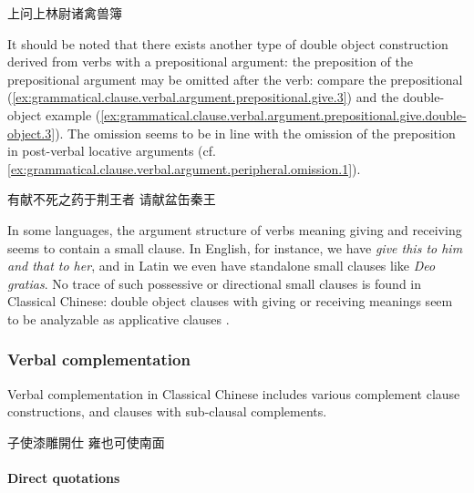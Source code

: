 \documentclass[UTF8, a4paper, oneside, scheme=plain, 12pt]{ctexrep}
\newcommand*{\citepages}[1]{pp.~{#1}}
\newcommand{\form}[1]{\emph{#1}}
\begin{document}
\begin{exe}
    \ex\label{ex:grammatical.clause.verbal.argument.prepositional.ask.double-object.2} 上问上林尉诸禽兽簿
\end{exe}

It should be noted that there exists another type of double object construction
derived from verbs with a prepositional argument:
the preposition of the prepositional argument may be omitted after the verb:
compare the prepositional (\ref{ex:grammatical.clause.verbal.argument.prepositional.give.3})
and the double-object example (\ref{ex:grammatical.clause.verbal.argument.prepositional.give.double-object.3}).
The omission seems to be in line with the omission of the preposition in post-verbal locative arguments (cf. \ref{ex:grammatical.clause.verbal.argument.peripheral.omission.1}).

\begin{exe}
    \ex\label{ex:grammatical.clause.verbal.argument.prepositional.give.3} 有献不死之药于荆王者
    \ex\label{ex:grammatical.clause.verbal.argument.prepositional.give.double-object.3}  请献盆缶秦王 
\end{exe}

In some languages, the argument structure of verbs meaning giving and receiving
seems to contain a small clause.
In English, for instance, we have \form{give this to him and that to her},
and in Latin we even have standalone small clauses like \form{Deo gratias}.
No trace of such possessive or directional small clauses is found in Classical Chinese:
double object clauses with giving or receiving meanings seem to be analyzable as applicative clauses
\citep[\citepages{416-421}]{meiguang2018}.

\subsubsection{Verbal complementation}

Verbal complementation in Classical Chinese includes various complement clause constructions,
and clauses with sub-clausal complements.


\begin{exe}
    \ex 子使漆雕開仕
    \ex 雍也可使南面
\end{exe}

\paragraph{Direct quotations}\label{sec:grammatical.clause.argument.verbal-complementation.direct-quotation}
\end{document}
